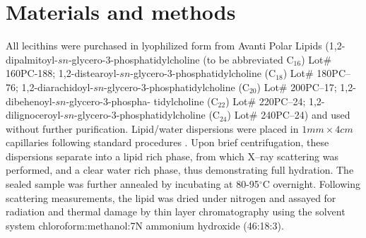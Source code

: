 \section{Materials and methods}


All lecithins were purchased in lyophilized form from Avanti Polar Lipids
(1,2-dipalmitoyl-$sn$-glycero-3-phosphatidylcholine (to be abbreviated C$_{16}$) Lot\# 
160PC-188; 1,2-distearoyl-$sn$-glycero-3-phosphatidylcholine (C$_{18}$) 
Lot\# 180PC--76; 1,2-diarachidoyl-$sn$-glycero-3-phosphatidylcholine (C$_{20}$)
Lot\# 200PC--17; 1,2-dibehenoyl-$sn$-glycero-3-phospha- tidylcholine (C$_{22}$)
Lot\# 220PC--24; 1,2-dilignoceroyl-$sn$-glycero-3-phosphatidylcholine (C$_{24}$)
Lot\# 240PC--24) and used without further purification.
Lipid/water dispersions were placed in
$1mm \times 4cm$ capillaries following standard procedures \cite{STN92}. 
Upon brief centrifugation, these dispersions separate
into a lipid rich phase, from which X--ray scattering was performed, and a clear
water rich phase, thus demonstrating full hydration.  The sealed sample
was further annealed by incubating at 80-95$^{\circ}$C overnight. 
Following scattering measurements, the lipid was dried under nitrogen
and assayed for radiation and thermal damage by thin layer chromatography 
using the solvent system chloroform:methanol:7N ammonium hydroxide (46:18:3).



